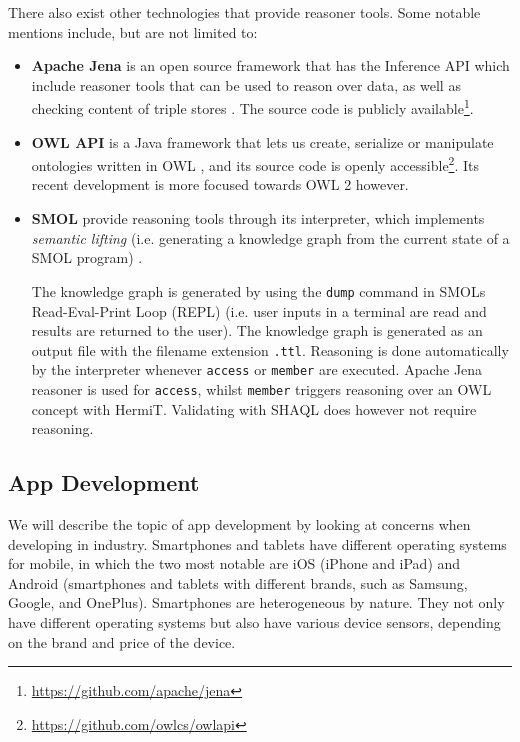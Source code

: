 \documentclass{article}
\begin{document}
There also exist other technologies that provide reasoner tools. Some notable mentions include, but are not limited to:
\begin{itemize}
    \item{\textbf{Apache Jena}} is an open source framework that has the Inference API which include reasoner tools that can be used to reason over data, as well as checking content of triple stores \cite{noauthor_apache_nodate-1}. The source code is publicly available\footnote{\url{https://github.com/apache/jena}}.
    \item{\textbf{OWL API}} is a Java framework that lets us create, serialize or manipulate ontologies written in OWL \cite{noauthor_owl_nodate}, and its source code is openly accessible\footnote{\url{https://github.com/owlcs/owlapi}}. Its recent development is more focused towards OWL 2 however.
    \item{\textbf{SMOL}} provide reasoning tools through its interpreter, which implements \emph{semantic lifting} (i.e. generating a knowledge graph from the current state of a SMOL program) \cite{noauthor_semantic_nodate}. 
    
    The knowledge graph is generated by using the \verb|dump| command in SMOLs Read-Eval-Print Loop (REPL) (i.e. user inputs in a terminal are read and results are returned to the user). The knowledge graph is generated as an output file with the filename extension \verb|.ttl|. Reasoning is done automatically by the interpreter whenever \verb|access| or \verb|member| are executed. Apache Jena reasoner is used for \verb|access|, whilst \verb|member| triggers reasoning over an OWL concept with HermiT. Validating with SHAQL does however not require reasoning.
\end{itemize}



\subsection{App Development}\label{subsec:AppDevelopment}
We will describe the topic of app development by looking at concerns when developing in industry. Smartphones and tablets have different operating systems for mobile, in which the two most notable are iOS (iPhone and iPad) and Android (smartphones and tablets with different brands, such as Samsung, Google, and OnePlus). Smartphones are heterogeneous by nature. They not only have different operating systems but also have various device sensors, depending on the brand and price of the device. 
\end{document}
